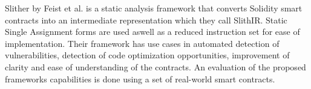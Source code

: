 \documentclass[sigconf]{acmart}
\begin{document}
Slither by Feist et al. \cite{slither} is a static analysis framework that converts Solidity smart contracts into an intermediate representation which they call SlithIR. Static Single Assignment forms are used aswell as a reduced instruction set for ease of implementation. Their framework has use cases in automated detection of vulnerabilities, detection of code optimization opportunities, improvement of clarity and ease of understanding of the contracts. An evaluation of the proposed frameworks capabilities is done using a set of real-world smart contracts. 





\end{document}
